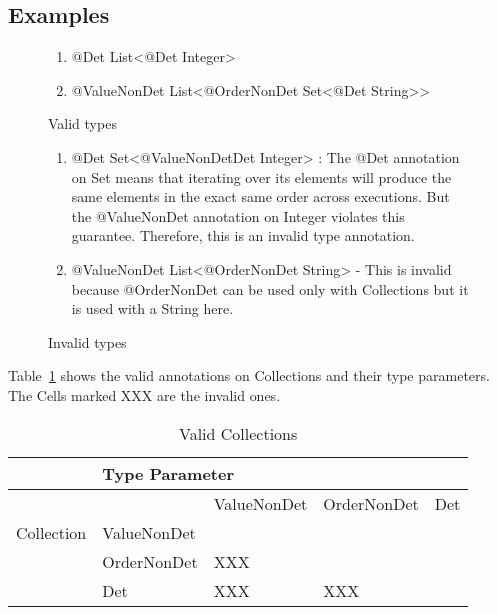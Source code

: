 \subsection{Examples\label{validity-examples}}
\begin{figure}[h]\caption{Valid types}
	\begin{enumerate}
		\item @Det List<@Det Integer>
		\item @ValueNonDet List<@OrderNonDet Set<@Det String>>
	\end{enumerate}
\end{figure}

\begin{figure}[h]\caption{Invalid types}
	\begin{enumerate}
		\item @Det Set<@ValueNonDetDet Integer> : The @Det annotation on Set means that iterating over its elements will produce the same
		elements in the exact same order across executions. But the @ValueNonDet annotation on Integer violates this guarantee. Therefore, this is an invalid type annotation.
		\item @ValueNonDet List<@OrderNonDet String> - This is invalid because @OrderNonDet can be used only with Collections but it is used with a String here.
	\end{enumerate}
\end{figure}

Table~\ref{Tab:validity} shows the valid annotations on Collections and their type parameters.
The Cells marked XXX are the invalid ones.
\begin{table}[h]
	\centering
	\caption{Valid Collections}
	\label{Tab:validity}
	\begin{tabular}{|l|l|l|l|l|}
		\hline
		& 		\multicolumn{4}{l|}{Type Parameter}		                                                                   \\ \hline
		&             & ValueNonDet                                     & OrderNonDet              & Det \\ \cline{2-5}
		Collection    & ValueNonDet &                                                 &                          &     \\ \cline{2-5}
		& OrderNonDet &   XXX  &                          &     \\ \cline{2-5}
		& Det         &         XXX               &  	XXX	&     \\ \hline
	\end{tabular}
\end{table}

